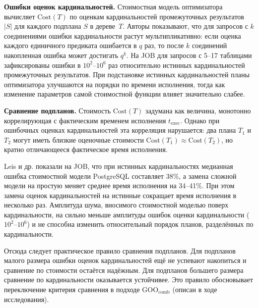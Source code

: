 \textbf{Ошибки оценок кардинальностей.}
Стоимостная модель оптимизатора вычисляет $\mathrm{Cost}(T)$ по оценкам кардинальностей
промежуточных результатов $|S|$ для каждого подплана $S$ в дереве~$T$.
Авторы показывают, что для запросов с $k$ соединениями ошибки кардинальности
растут мультипликативно: если оценка каждого единичного предиката ошибается в $q$ раз,
то после $k$ соединений накопленная ошибка может достигать $q^k$.
На JOB для запросов с 5--17 таблицами зафиксированы ошибки в $10^2$--$10^6$ раз
относительно истинных кардинальностей промежуточных результатов.
При подстановке истинных кардинальностей планы оптимизатора улучшаются на порядки
по времени исполнения, тогда как изменение параметров самой стоимостной функции влияет значительно слабее.
\par

\textbf{Сравнение подпланов.}
Стоимость $\mathrm{Cost}(T)$ задумана как величина, монотонно коррелирующая
с фактическим временем исполнения $t_{\mathrm{exec}}$.
Однако при ошибочных оценках кардинальностей эта корреляция нарушается:
два плана $T_1$ и $T_2$ могут иметь близкие оценочные стоимости
$\mathrm{Cost}(T_1) \approx \mathrm{Cost}(T_2)$, но кратно отличающееся
фактическое время исполнения.
\par

Leis и др. \cite{HowGoodJournal} показали на JOB, что при истинных 
кардинальностях медианная ошибка стоимостной модели PostgreSQL
составляет 38\%, а замена сложной модели на простую меняет
среднее время исполнения на 34--41\%. При этом замена оценок кардинальностей
на истинные сокращает время исполнения в несколько раз.
Амплитуда шума, вносимого стоимостной моделью поверх кардинальности, 
на сильно меньше амплитуды ошибок оценки кардинальности ($10^2$--$10^6$) и не 
способна изменить относительный порядок планов, разделённых по кардинальности.
\par

Отсюда следует практическое правило сравнения подпланов.
Для подпланов малого размера ошибки оценок кардинальностей ещё не успевают накопиться и сравнение
по стоимости остаётся надёжным.
Для подпланов большего размера сравнение по кардинальности оказывается устойчивее. Это правило обосновывает переключение критерия сравнения в подходе
$\mathrm{GOO_{comb}}$ (описан в ходе исследования).
\par
